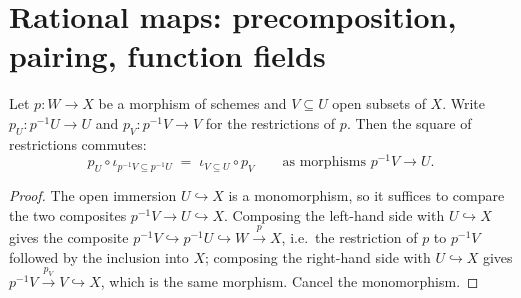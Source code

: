 \section{Rational maps: precomposition, pairing, function fields}
\label{pa-sec:ratmaps}

\begin{lemma}
  \label{pa-lem:ratmap_restrict_square}
  \leanok

  Let \(p : W \to X\) be a morphism of schemes and \(V \subseteq U\) open subsets
  of \(X\). Write \(p_U : p^{-1}U \to U\) and \(p_V : p^{-1}V \to V\) for the
  restrictions of \(p\). Then the square of restrictions commutes:
  \[
    p_U \circ \iota_{p^{-1}V \subseteq p^{-1}U}
    \;=\; \iota_{V \subseteq U} \circ p_V
    \qquad\text{as morphisms } p^{-1}V \to U .
  \]
\end{lemma}
\begin{proof}
  \leanok
  The open immersion \(U \hookrightarrow X\) is a monomorphism, so it suffices to
  compare the two composites \(p^{-1}V \to U \hookrightarrow X\). Composing the
  left-hand side with \(U \hookrightarrow X\) gives the composite
  \(p^{-1}V \hookrightarrow p^{-1}U \hookrightarrow W \xrightarrow{p} X\), i.e.\
  the restriction of \(p\) to \(p^{-1}V\) followed by the inclusion into \(X\);
  composing the right-hand side with \(U \hookrightarrow X\) gives
  \(p^{-1}V \xrightarrow{p_V} V \hookrightarrow X\), which is the same morphism.
  Cancel the monomorphism.
\end{proof}

